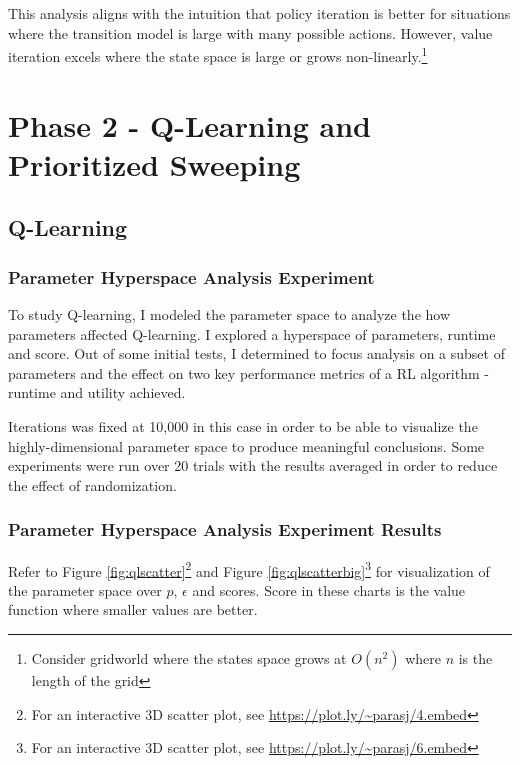 \documentclass[11pt]{article}
\begin{document}
This analysis aligns with the intuition that policy iteration is better for situations where the transition model is large with many possible actions. However, value iteration excels where the state space is large or grows non-linearly.\footnote{Consider gridworld where the states space grows at $O(n^2)$ where $n$ is the length of the grid}




\section{Phase 2 - Q-Learning and Prioritized Sweeping}

\subsection{Q-Learning}

\subsubsection{Parameter Hyperspace Analysis Experiment}

To study Q-learning, I modeled the parameter space to analyze the how parameters affected Q-learning. I explored a hyperspace of parameters, runtime and score. Out of some initial tests, I determined to focus analysis on a subset of parameters and the effect on two key performance metrics of a RL algorithm - runtime and utility achieved.

Iterations was fixed at 10,000 in this case in order to be able to visualize the highly-dimensional parameter space to produce meaningful conclusions. Some experiments were run over 20 trials with the results averaged in order to reduce the effect of randomization.

\subsubsection{Parameter Hyperspace Analysis Experiment Results}

Refer to Figure \ref{fig:qlscatter}\footnote{For an interactive 3D scatter plot, see \url{https://plot.ly/~parasj/4.embed}} and Figure \ref{fig:qlscatterbig}\footnote{\label{qlscatterbigsouce}For an interactive 3D scatter plot, see \url{https://plot.ly/~parasj/6.embed}} for visualization of the parameter space over $p$, $\epsilon$ and scores. Score in these charts is the value function where smaller values are better.
\end{document}

